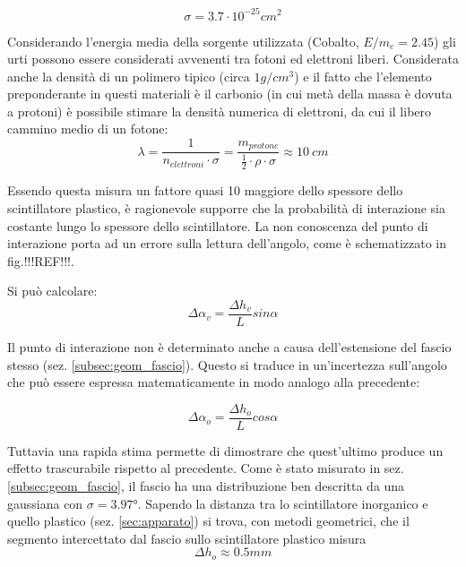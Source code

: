 \documentclass[5pt]{article}
\begin{document}
\begin{equation}
\sigma = 3.7 \cdot 10^{-25} cm^2
\nonumber
\end{equation}

Considerando l'energia media della sorgente utilizzata (Cobalto, $E/m_e = 2.45$) gli urti possono essere considerati avvenenti tra fotoni ed elettroni liberi. Considerata anche la densità di un polimero tipico (circa $1 g/cm^3$) e il fatto che l'elemento preponderante in questi materiali è il carbonio (in cui metà della massa è dovuta a protoni) è possibile stimare la densità numerica di elettroni, da cui il libero cammino medio di un fotone: \\
 
\begin{equation}
\lambda = \frac{1}{n_{elettroni} \cdot \sigma} = \frac{m_{protone}}{\frac{1}{2} \cdot \rho \cdot \sigma} \approx 10 \ cm
\nonumber
\end{equation}

Essendo questa misura un fattore quasi 10 maggiore dello spessore dello scintillatore plastico, è ragionevole supporre che la probabilità di interazione sia costante lungo lo spessore dello scintillatore. La non conoscenza del punto di interazione porta ad un errore sulla lettura dell'angolo, come è schematizzato in fig.!!!REF!!!. 


Si può calcolare:
\begin{equation}
\Delta \alpha_v = \frac{\Delta h_v}{L} sin\alpha
\nonumber
\end{equation}

Il punto di interazione non è determinato anche a causa dell'estensione del fascio stesso (sez. \ref{subsec:geom_fascio}). Questo si traduce in un'incertezza sull'angolo che può essere espressa matematicamente in modo analogo alla precedente:

\begin{equation}
\Delta \alpha_o = \frac{\Delta h_o}{L} cos\alpha
\nonumber
\end{equation}

Tuttavia una rapida stima permette di dimostrare che quest'ultimo produce un effetto trascurabile rispetto al precedente. Come è stato misurato in sez. \ref{subsec:geom_fascio}, il fascio ha una distribuzione ben descritta da una gaussiana con $\sigma = 3.97 °$. Sapendo la distanza tra lo scintillatore inorganico e quello plastico (sez. \ref{sec:apparato}) si trova, con metodi geometrici, che il segmento intercettato dal fascio sullo scintillatore plastico misura \\
\begin{equation}
\Delta h_o \approx 0.5 mm
\end{equation}
\end{document}
